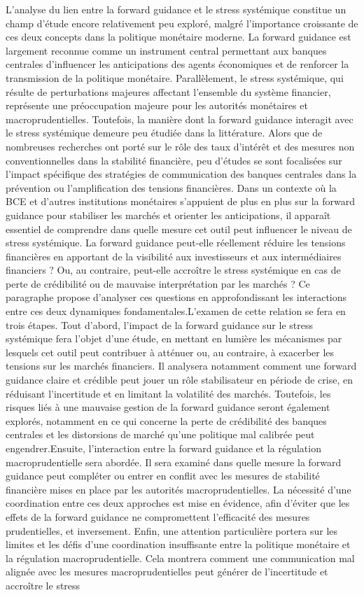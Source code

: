 L’analyse du lien entre la forward guidance et le stress systémique constitue un champ d’étude encore relativement peu exploré, malgré l’importance croissante de ces deux concepts dans la politique monétaire moderne. La forward guidance est largement reconnue comme un instrument central permettant aux banques centrales d’influencer les anticipations des agents économiques et de renforcer la transmission de la politique monétaire. Parallèlement, le stress systémique, qui résulte de perturbations majeures affectant l’ensemble du système financier, représente une préoccupation majeure pour les autorités monétaires et macroprudentielles. Toutefois, la manière dont la forward guidance interagit avec le stress systémique demeure peu étudiée dans la littérature. Alors que de nombreuses recherches ont porté sur le rôle des taux d’intérêt et des mesures non conventionnelles dans la stabilité financière, peu d’études se sont focalisées sur l’impact spécifique des stratégies de communication des banques centrales dans la prévention ou l’amplification des tensions financières. Dans un contexte où la BCE et d’autres institutions monétaires s’appuient de plus en plus sur la forward guidance pour stabiliser les marchés et orienter les anticipations, il apparaît essentiel de comprendre dans quelle mesure cet outil peut influencer le niveau de stress systémique. La forward guidance peut-elle réellement réduire les tensions financières en apportant de la visibilité aux investisseurs et aux intermédiaires financiers ? Ou, au contraire, peut-elle accroître le stress systémique en cas de perte de crédibilité ou de mauvaise interprétation par les marchés ? Ce paragraphe propose d’analyser ces questions en approfondissant les interactions entre ces deux dynamiques fondamentales.L’examen de cette relation se fera en trois étapes. Tout d’abord, l’impact de la forward guidance sur le stress systémique fera l'objet d'une étude, en mettant en lumière les mécanismes par lesquels cet outil peut contribuer à atténuer ou, au contraire, à exacerber les tensions sur les marchés financiers. Il analysera notamment comment une forward guidance claire et crédible peut jouer un rôle stabilisateur en période de crise, en réduisant l’incertitude et en limitant la volatilité des marchés. Toutefois, les risques liés à une mauvaise gestion de la forward guidance seront également explorés, notamment en ce qui concerne la perte de crédibilité des banques centrales et les distorsions de marché qu’une politique mal calibrée peut engendrer.Ensuite, l’interaction entre la forward guidance et la régulation macroprudentielle sera abordée. Il sera examiné dans quelle mesure la forward guidance peut compléter ou entrer en conflit avec les mesures de stabilité financière mises en place par les autorités macroprudentielles. La nécessité d’une coordination entre ces deux approches est mise en évidence, afin d’éviter que les effets de la forward guidance ne compromettent l’efficacité des mesures prudentielles, et inversement. Enfin, une attention particulière portera sur les limites et les défis d’une coordination insuffisante entre la politique monétaire et la régulation macroprudentielle. Cela montrera comment une communication mal alignée avec les mesures macroprudentielles peut générer de l’incertitude et accroître le stress 